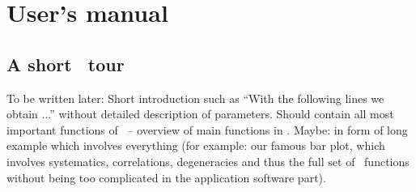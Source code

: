 
\part{User's manual}
\chapter{A short \GLOBES\ tour}

To be written later: Short introduction such as ``With the following lines we obtain ...''
without detailed description of parameters. Should contain all most important functions of \GLOBES\ --
overview of main functions in .
Maybe: in form of long example which involves everything (for example: our famous bar plot, which involves
systematics, correlations, degeneracies and thus the full set of \GLOBES\ functions without being too
complicated in the application software part).

